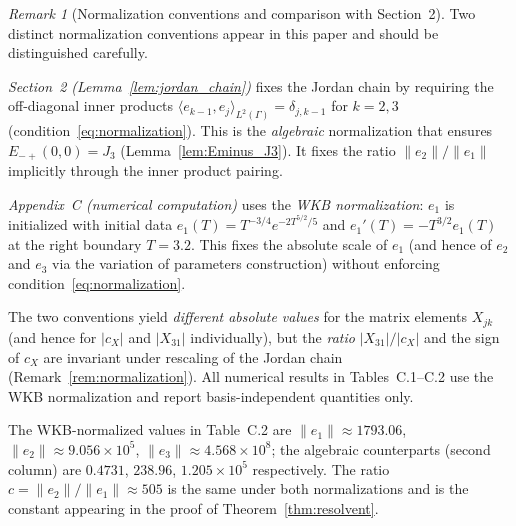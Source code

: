\documentclass[12pt,a4paper]{amsart}
\theoremstyle{remark}
\newtheorem{remark}[theorem]{Remark}
\begin{document}
\begin{remark}[Normalization conventions and comparison with Section~2]
\label{rem:normalization_convention}
Two distinct normalization conventions appear in this paper and should be
distinguished carefully.

\emph{Section~2 (Lemma~\ref{lem:jordan_chain})} fixes the Jordan chain by
requiring the off-diagonal inner products
$\langle e_{k-1}, e_j\rangle_{L^2(\Gamma)} = \delta_{j,k-1}$
for $k = 2, 3$ (condition~\eqref{eq:normalization}). This is the \emph{algebraic}
normalization that ensures $E_{-+}(0,0) = J_3$ (Lemma~\ref{lem:Eminus_J3}).
It fixes the ratio $\|e_2\|/\|e_1\|$ implicitly through the inner product pairing.

\emph{Appendix~C (numerical computation)} uses the \emph{WKB normalization}:
$e_1$ is initialized with initial data
$e_1(T) = T^{-3/4}e^{-2T^{5/2}/5}$ and $e_1'(T) = -T^{3/2} e_1(T)$
at the right boundary $T = 3.2$. This fixes the absolute scale of $e_1$ (and
hence of $e_2$ and $e_3$ via the variation of parameters construction) without
enforcing condition~\eqref{eq:normalization}.

The two conventions yield \emph{different absolute values} for the matrix
elements $X_{jk}$ (and hence for $|c_X|$ and $|X_{31}|$ individually), but
the \emph{ratio} $|X_{31}|/|c_X|$ and the sign of $c_X$ are invariant under
rescaling of the Jordan chain (Remark~\ref{rem:normalization}). All numerical
results in Tables~C.1--C.2 use the WKB normalization and report
basis-independent quantities only.

The WKB-normalized values in Table~C.2 are
$\|e_1\| \approx 1793.06$, $\|e_2\| \approx 9.056\times10^5$,
$\|e_3\| \approx 4.568\times10^8$; the algebraic counterparts (second column)
are $0.4731$, $238.96$, $1.205\times10^5$ respectively.
The ratio $c = \|e_2\|/\|e_1\| \approx 505$ is the same under both
normalizations and is the constant appearing in the proof of
Theorem~\ref{thm:resolvent}.
\end{remark}
\end{document}

